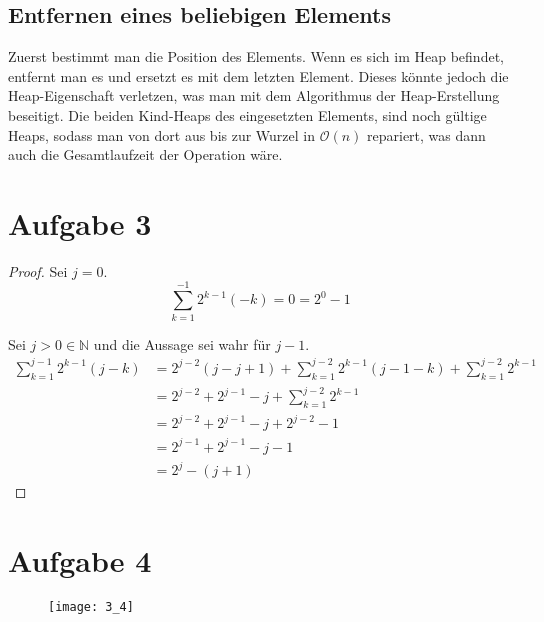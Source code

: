 \documentclass[10pt,a4paper]{article}
\begin{document}
\subsection{Entfernen eines beliebigen Elements}
Zuerst bestimmt man die Position des Elements.
Wenn es sich im Heap befindet, entfernt man es und ersetzt es mit dem letzten Element.
Dieses könnte jedoch die Heap-Eigenschaft verletzen, was man mit dem Algorithmus der Heap-Erstellung beseitigt.
Die beiden Kind-Heaps des eingesetzten Elements, sind noch gültige Heaps, sodass man von dort aus bis zur Wurzel in $\mathcal{O}(n)$ repariert, was dann auch die Gesamtlaufzeit der Operation wäre.

\section{Aufgabe 3}
\begin{proof}
  Sei $j = 0$.
  \begin{equation}
    \sum_{k = 1}^{-1} 2^{k - 1} (-k) = 0 = 2^{0} - 1
  \end{equation}
  
  Sei $j > 0 \in \mathbb{N}$ und die Aussage sei wahr für $j - 1$.
  \begin{align*}
    \sum_{k = 1}^{j - 1} 2^{k - 1} (j - k) & = 2^{j - 2} (j - j + 1) + \sum_{k = 1}^{j - 2} 2^{k - 1} (j - 1 - k) + \sum_{k = 1}^{j - 2} 2^{k - 1}\\
    & = 2^{j - 2} + 2^{j - 1} - j + \sum_{k = 1}^{j - 2} 2^{k - 1}\\
    & = 2^{j - 2} + 2^{j - 1} - j + 2^{j - 2} - 1\\
    & = 2^{j - 1} + 2^{j - 1} - j - 1\\
    & = 2^{j} - (j + 1)
  \end{align*}
\end{proof}

\section{Aufgabe 4}

\begin{figure}[H]
  \texttt{[image: 3\_4]}
\end{figure}
\end{document}
